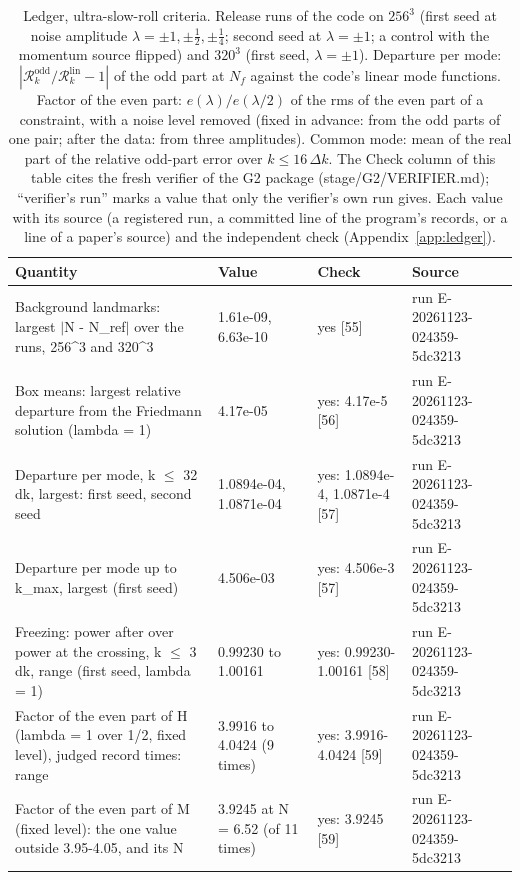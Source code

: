 \begin{table}
\caption{Ledger, ultra-slow-roll criteria. Release runs of the code on $256^3$ (first seed at noise amplitude $\lambda = \pm1, \pm\frac12, \pm\frac14$; second seed at $\lambda = \pm1$; a control with the momentum source flipped) and $320^3$ (first seed, $\lambda = \pm1$). Departure per mode: $|\mathcal{R}^\mathrm{odd}_k/\mathcal{R}^\mathrm{lin}_k - 1|$ of the odd part at $N_f$ against the code's linear mode functions. Factor of the even part: $e(\lambda)/e(\lambda/2)$ of the rms of the even part of a constraint, with a noise level removed (fixed in advance: from the odd parts of one pair; after the data: from three amplitudes). Common mode: mean of the real part of the relative odd-part error over $k \le 16\,\Delta k$. The Check column of this table cites the fresh verifier of the G2 package (stage/G2/VERIFIER.md); ``verifier's run'' marks a value that only the verifier's own run gives. Each value with its source (a registered run, a committed line of the program's records, or a line of a paper's source) and the independent check (Appendix~\ref{app:ledger}).}
\label{tab:ledgerultraslowrollcriteria}
\footnotesize
\begin{tabular}{p{}p{}p{}p{}}
\toprule
Quantity & Value & Check & Source \\
\midrule
Background landmarks: largest $|$N - N\_ref$|$ over the runs, 256\^{}3 and 320\^{}3 & 1.61e-09, 6.63e-10 & yes [55] & run E-20261123-024359-5dc3213 \\
Box means: largest relative departure from the Friedmann solution (lambda = 1) & 4.17e-05 & yes: 4.17e-5 [56] & run E-20261123-024359-5dc3213 \\
Departure per mode, k $\le$ 32 dk, largest: first seed, second seed & 1.0894e-04, 1.0871e-04 & yes: 1.0894e-4, 1.0871e-4 [57] & run E-20261123-024359-5dc3213 \\
Departure per mode up to k\_max, largest (first seed) & 4.506e-03 & yes: 4.506e-3 [57] & run E-20261123-024359-5dc3213 \\
Freezing: power after over power at the crossing, k $\le$ 3 dk, range (first seed, lambda = 1) & 0.99230 to 1.00161 & yes: 0.99230-1.00161 [58] & run E-20261123-024359-5dc3213 \\
Factor of the even part of H (lambda = 1 over 1/\allowbreak{}2, fixed level), judged record times: range & 3.9916 to 4.0424 (9 times) & yes: 3.9916-4.0424 [59] & run E-20261123-024359-5dc3213 \\
Factor of the even part of M (fixed level): the one value outside 3.95-4.05, and its N & 3.9245 at N = 6.52 (of 11 times) & yes: 3.9245 [59] & run E-20261123-024359-5dc3213 \\

\end{tabular}
\end{table}
